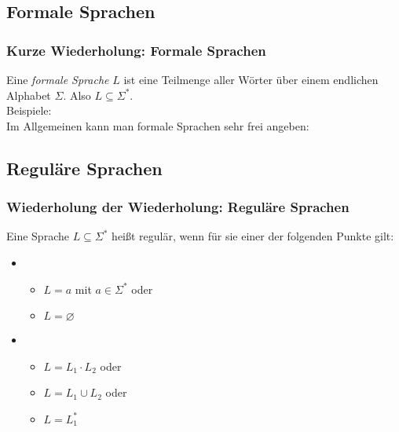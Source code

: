 \documentclass{beamer}
\begin{document}
{\subsection{Formale Sprachen}
\begin{frame}
	\frametitle{Kurze Wiederholung: Formale Sprachen}
	Eine \emph{formale Sprache} $L$ ist eine Teilmenge aller Wörter über einem endlichen Alphabet $\Sigma$. Also $L \subseteq \Sigma^*$.\\[0.3cm]
	Beispiele:
	\\[0.2cm]
Im Allgemeinen kann man formale Sprachen sehr frei angeben: 
\end{frame}
\subsection{Reguläre Sprachen}
\begin{frame}
 \frametitle{Wiederholung der Wiederholung: Reguläre Sprachen}
\vspace{-1cm}

        Eine Sprache \(L\subseteq\Sigma^*\) heißt regulär, wenn für sie einer der folgenden Punkte gilt:


\begin{itemize}
\item \begin{itemize}Verankerung
\item \(L = {a}\) mit \(a\in\Sigma^*\) oder
\item \(L = \varnothing \)
\end{itemize}
\item \begin{itemize}Induktion: Seien \(L_1\), \(L_2\) reguläre Sprachen.
      \item \(L = L_1 \cdot L_2\) oder
      \item \(L = L_1 \cup L_2\) oder
      \item \(L = L_1^*\)
      \end{itemize}


\end{itemize}
\end{frame}}
\end{document}
